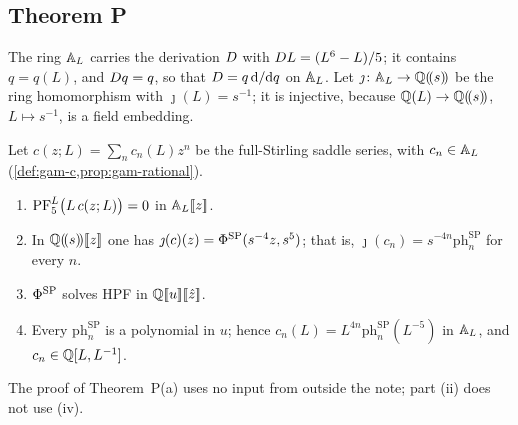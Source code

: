 \subsection{Theorem P}
\label{sec:con-P}

The ring $\mathbb{A}_{L}$ carries the derivation $D$ with $D L=(L^6-L)/5$; it contains $q=q(L)$, and $D q=q$, so that $D=q\,\mathrm{d}/\mathrm{d} q$ on $\mathbb{A}_{L}$. Let $\jmath\colon\mathbb{A}_{L}\to\mathbb{Q}(\!(s)\!)$ be the ring homomorphism with $\jmath(L)=s^{-1}$; it is injective, because $\mathbb{Q}(L)\to\mathbb{Q}(\!(s)\!)$, $L\mapsto s^{-1}$, is a field embedding.

\begin{thm}[Theorem P(a)]
\label{thm:con-Pa}
Let $c(z;L)=\sum_nc_n(L)z^n$ be the full-Stirling saddle series, with $c_n\in\mathbb{A}_{L}$ (\cref{def:gam-c,prop:gam-rational}).
\begin{enumerate}
\item $\mathrm{PF}_{5}^{L}\bigl(L\,c(z;L)\bigr)=0$ in $\mathbb{A}_{L}[\![ z ]\!]$.
\item In $\mathbb{Q}(\!(s)\!)[\![ z ]\!]$ one has $\jmath(c)(z)=\Phi^{\mathrm{SP}}(s^{-4}z,s^5)$; that is, $\jmath(c_n)=s^{-4n}\mathrm{ph}^{\mathrm{SP}}_n$ for every $n$.
\item $\Phi^{\mathrm{SP}}$ solves HPF in $\mathbb{Q}[\![ u ]\!][\![ \hat{z} ]\!]$.
\item Every $\mathrm{ph}^{\mathrm{SP}}_n$ is a polynomial in $u$; hence $c_n(L)=L^{4n}\mathrm{ph}^{\mathrm{SP}}_n(L^{-5})$ in $\mathbb{A}_{L}$, and $c_n\in\mathbb{Q}[L,L^{-1}]$.
\end{enumerate}
\end{thm}

The proof of Theorem~P(a) uses no input from outside the note; part (ii) does not use (iv).

